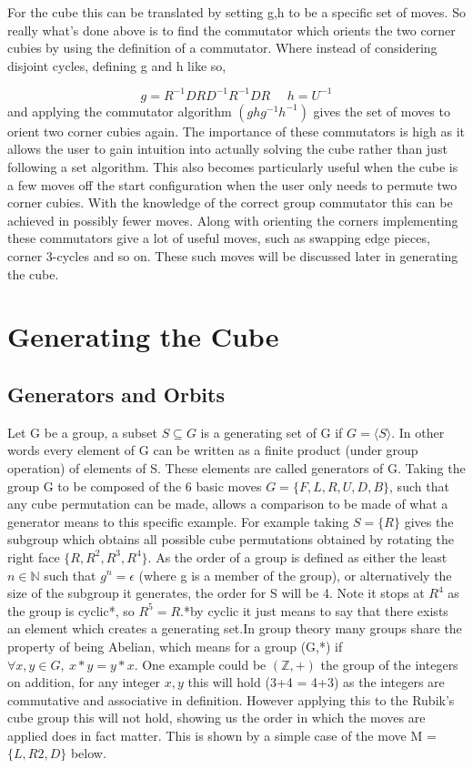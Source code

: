 \documentclass{article}
\newcounter{theo}[section]\setcounter{theo}{0}
\newcounter{prop}[section]\setcounter{prop}{0}
\newcounter{lem}[section]\setcounter{lem}{0}
\begin{document}
For the cube this can be translated by setting g,h to be a specific set of moves. So really what's done above is to find the commutator which orients the two corner cubies by using the definition of a commutator. Where instead of considering disjoint cycles, defining g and h like so,

\begin{equation}\label{orient}
	g = R^{-1}DRD^{-1}R^{-1}DR\ \ \ \ \ \ 
    h = U^{-1}
\end{equation}
and applying the commutator algorithm $(ghg^{-1}h^{-1})$ gives the set of moves to orient two corner cubies again. The importance of these commutators is high as it allows the user to gain intuition into actually solving the cube rather than just following a set algorithm. This also becomes particularly useful when the cube is a few moves off the start configuration when the user only needs to permute two corner cubies.  With the knowledge of the correct group commutator this can be achieved in possibly fewer moves. Along with orienting the corners implementing these commutators give a lot of useful moves, such as swapping edge pieces, corner 3-cycles and so on. These such moves will be discussed later in generating the cube.

\section{Generating the Cube}
\subsection{Generators and Orbits}
Let G be a group, a subset $S\subseteq G$ is a generating set of G if $G =\langle S\rangle $. In other words every element of G can be written as a finite product (under group operation) of elements of S. These elements are called generators of G. Taking the group G to be composed of the 6 basic moves  $G= \{{F,L,R,U,D,B}\}$, such that  any cube permutation can be made, allows a comparison to be made of what a generator means to this specific example. For example taking $S=\{R\}$ gives the subgroup which obtains all possible cube permutations obtained by rotating the right face $\{R,R^2,R^3,R^4\}$. As the order of a group is defined as either the least $n \in \mathbb{N}$ such that $g^n = \epsilon$ (where g is a member of the group),  or alternatively the size of the subgroup it generates, the order for S will be 4. Note it stops at $R^4$ as the group is cyclic*, so $R^5= R$.*by cyclic it just means to say that there exists an element which creates a generating set.\newline In group theory many groups share the property of being Abelian, which means for a group (G,*) if $\forall x,y \in G,\ x*y=y*x$. One example could be $(\mathbb{Z},+)$ the group of the integers on addition, for any integer $x,y$ this will hold (3+4 = 4+3) as the integers are commutative and associative in definition.
However applying this to the Rubik's cube group this will not hold, showing us the order in which the moves are applied does in fact matter. This is shown by a simple case of the move M = $\{L,R2,D\}$ below.
\end{document}
